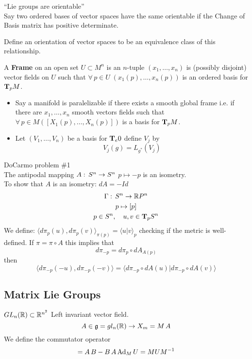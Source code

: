 ``Lie groups are orientable''\\
Say two ordered bases of vector spaces have the same orientable if the Change of Basis matrix has positive determinate.

Define an orientation of vector spaces to be an equivalence class of this relationship.

\begin{ddef}
A \textbf{Frame} on an open set $U\subset M^n$ is an $n$-tuple $(x_1,\ldots, x_n)$ is (possibly disjoint) vector fields on $U$ such that $\forall \, p\in U\; (x_1(p),\ldots, x_n(p))$ is an ordered basis for $\text{\textbf{T}}_p M$.
\end{ddef}

\begin{itemize}
\item Say a manifold is paralelizable if there exists a smooth global frame i.e. if there are $x_1,\ldots, x_n$ smooth vectors fields such that $\forall\, p\in M([X_1(p), \ldots, X_n(p)]) $ is a basis for $\text{\textbf{T}}_p M$.
\item Let $(V_1, \ldots, V_n)$ be a basis for $\text{\textbf{T}}_e 0$ define $V_j$ by 
$$V_j (g) = L_{g^*} (V_j)$$
\end{itemize}

DoCarmo problem \#1\\
The antipodal mapping $A:\, S^n \to S^n$ $ p\mapsto -p$ is an isometry.\\
To show that $A$ is an isometry: $dA = -Id$
\begin{gather*}
\Gamma :\, S^n \to \mathbb{R} P^n\\
p\mapsto [p]\\
p\in S^n , \quad u,v \in \text{\textbf{T}}_p S^n
\end{gather*}
We define: $\langle d\pi_p(u),d\pi_p(v) \rangle_{\pi(p)} = \langle u | v\rangle_p$ checking if the metric is well-defined. If $\pi = \pi\circ A$ this implies that
$$d\pi_{-p} = d\pi_p \circ dA_{A(p)}$$
then
$$\langle d\pi_{-p}(-u), d\pi_{-p}(-v)\rangle = \langle d\pi_{-p}\circ dA(u) | d\pi_{-p} \circ dA(v) \rangle$$

\subsection{Matrix Lie Groups}
$GL_n(\mathbb{R}) \subset \mathbb{R}^{n^2}$ Left invariant vector field.
$$A\in \mathfrak{g} = gl_n(\mathbb{R}) \to X_m= M\,A$$
We define the commutator operator 
\begin{gather*}
[A,B] = A\,B - B\,A
\Ad_M U= M UM^{-1}
\end{gather*}

